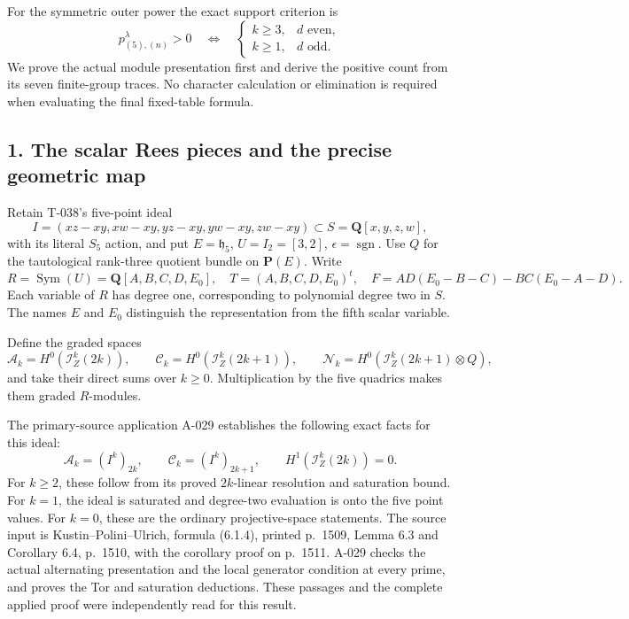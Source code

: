 \documentclass[
  10pt,
]{article}
\begin{document}
For the symmetric outer power the exact support criterion is \[
\boxed{
p_{(5),(n)}^\lambda>0\quad\Longleftrightarrow\quad
\begin{cases}
k\ge3,&d\text{ even},\\
k\ge1,&d\text{ odd}.
\end{cases}}
\tag{QP.2}
\] We prove the actual module presentation first and derive the positive
count from its seven finite-group traces. No character calculation or
elimination is required when evaluating the final fixed-table formula.

\subsection{1. The scalar Rees pieces and the precise geometric
map}\label{the-scalar-rees-pieces-and-the-precise-geometric-map}

Retain T-038's five-point ideal \[
I=(xz-xy,xw-xy,yz-xy,yw-xy,zw-xy)
\subset S=\mathbf Q[x,y,z,w],
\] with its literal \(S_5\) action, and put \(E=\mathfrak h_5\),
\(U=I_2=[3,2]\), \(\epsilon=\operatorname{sgn}\). Use \(Q\) for the
tautological rank-three quotient bundle on \(\mathbf P(E)\). Write \[
R=\operatorname{Sym}(U)=\mathbf Q[A,B,C,D,E_0],
\quad T=(A,B,C,D,E_0)^t,
\quad F=AD(E_0-B-C)-BC(E_0-A-D).
\tag{QP.3}
\] Each variable of \(R\) has degree one, corresponding to polynomial
degree two in \(S\). The names \(E\) and \(E_0\) distinguish the
representation from the fifth scalar variable.

Define the graded spaces \[
\mathcal A_k=H^0(\mathcal I_Z^k(2k)),\qquad
\mathcal C_k=H^0(\mathcal I_Z^k(2k+1)),\qquad
\mathcal N_k=H^0(\mathcal I_Z^k(2k+1)\otimes Q),
\tag{QP.4}
\] and take their direct sums over \(k\ge0\). Multiplication by the five
quadrics makes them graded \(R\)-modules.

The primary-source application A-029 establishes the following exact
facts for this ideal: \[
\mathcal A_k=(I^k)_{2k},\qquad
\mathcal C_k=(I^k)_{2k+1},\qquad
H^1(\mathcal I_Z^k(2k))=0.
\tag{QP.5}
\] For \(k\ge2\), these follow from its proved \(2k\)-linear resolution
and saturation bound. For \(k=1\), the ideal is saturated and degree-two
evaluation is onto the five point values. For \(k=0\), these are the
ordinary projective-space statements. The source input is
Kustin--Polini--Ulrich, formula (6.1.4), printed p.~1509, Lemma 6.3 and
Corollary 6.4, p.~1510, with the corollary proof on p.~1511. A-029
checks the actual alternating presentation and the local generator
condition at every prime, and proves the Tor and saturation deductions.
These passages and the complete applied proof were independently read
for this result.
\end{document}
